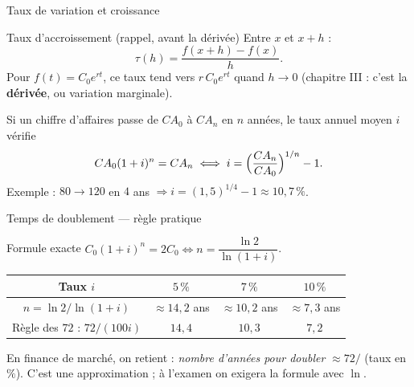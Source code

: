\documentclass[10pt,aspectratio=169]{beamer}
\numberwithin{dummy}{section}
\begin{document}
\begin{frame}{Taux de variation et croissance}
\begin{block}{Taux d'accroissement (rappel, avant la dérivée)}
Entre $x$ et $x+h$ :
\[
\tau(h)=\frac{f(x+h)-f(x)}{h}.
\]
Pour $f(t)=C_0 e^{rt}$, ce taux tend vers $r\, C_0 e^{rt}$ quand $h\to 0$
(chapitre III : c'est la \textbf{dérivée}, ou variation marginale).
\end{block}

\vspace{0.3em}
\begin{boxgestion}
Si un chiffre d'affaires passe de $CA_0$ à $CA_n$ en $n$ années,
le taux annuel moyen $i$ vérifie
\[
CA_0(1+i)^n=CA_n \iff i=\Bigl(\frac{CA_n}{CA_0}\Bigr)^{1/n}-1.
\]
Exemple : $80\to 120$ en $4$ ans $\Rightarrow i=(1{,}5)^{1/4}-1\approx 10{,}7\,\%$.
\end{boxgestion}
\end{frame}

\begin{frame}{Temps de doublement --- règle pratique}
\begin{block}{Formule exacte}
$C_0(1+i)^n=2C_0 \iff n=\dfrac{\ln 2}{\ln(1+i)}$.
\end{block}

\renewcommand{\arraystretch}{1.25}
\begin{center}
{\small
\begin{tabular}{@{}cccc@{}}
\toprule
Taux $i$ & $5\,\%$ & $7\,\%$ & $10\,\%$ \\
\midrule
$n=\ln 2/\ln(1+i)$ & $\approx 14{,}2$ ans & $\approx 10{,}2$ ans & $\approx 7{,}3$ ans \\
Règle des $72$ : $72/(100i)$ & $14{,}4$ & $10{,}3$ & $7{,}2$ \\
\bottomrule
\end{tabular}
}
\end{center}

\vspace{0.35em}
\begin{boxsynthese}
En finance de marché, on retient : \emph{nombre d'années pour doubler} $\approx 72/$ (taux en $\%$).
C'est une approximation ; à l'examen on exigera la formule avec $\ln$.
\end{boxsynthese}
\end{frame}
\end{document}
